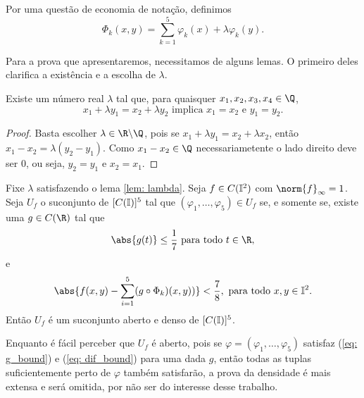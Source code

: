 \begin{rem}
    Por uma questão de economia de notação, definimos \[
        \Phi_{ k }(x, y) = \sum_{ k=1 }^{ 5 } \varphi_{ k } (x) + \lambda \varphi_{ k } (y)
    .\]
\end{rem}
Para a prova que apresentaremos, necessitamos de alguns lemas.
O primeiro deles clarifica a existência e a escolha de \( \lambda \).
\begin{lem}
    Existe um número real \( \lambda \) tal que, para quaisquer \( x_{ 1 }, x_{ 2 }, x_{ 3 }, x_{ 4 } \in \Q \), \[
        x_{ 1 } + \lambda y_{ 1 } = x_{ 2 } + \lambda y_{ 2 }
        \text{ implica }
        x_{ 1 } = x_{ 2 } \text{ e } y_{ 1 } = y_{ 2 }
    .\]
    \label{lem: lambda}
\end{lem}
\begin{proof}
    Basta escolher \( \lambda \in \R \backslash \Q \), pois se \( x_{ 1 } + \lambda y_{ 1 } = x_{ 2 } + \lambda x_{ 2 } \), então \( x_{ 1 } - x_{ 2 } = \lambda ( y_{ 2 } - y_{ 1 } ) \).
    Como \( x_{ 1 } - x_{ 2 } \in \Q \) necessariametente o lado direito deve ser \( 0 \), ou seja, \( y_{ 2 } = y_{ 1 } \) e \( x_{ 2 } = x_{ 1 } \).
\end{proof}
\begin{lem}
    Fixe \( \lambda \) satisfazendo o lema \ref{lem: lambda}.
    Seja \( f \in C(\mathbb{I}^2) \) com \( \norm{ f }_{ \infty } = 1 \).
    Seja \( U_{ f } \) o suconjunto de \( [C(\mathbb{I})]^{ 5 } \) tal que \( ( \varphi_{ 1 }, \dots, \varphi_{ 5 } ) \in U_{ f } \) se, e somente se, existe uma \( g \in C(\R) \) tal que
    \begin{equation}
        \abs{ g(t) } \leq \frac{ 1 }{ 7 } \text{ para todo } t \in \R
        \label{eq: g_bound}
    ,\end{equation}
    e
    \begin{equation}
        \abs{ 
            f(x, y)
            - \sum_{ i=1 }^{ 5 } (g \circ \Phi_{ k })(x, y) )
         }
         < \frac{ 7 }{ 8 }, \text{ para todo } x, y \in \I^2
         \label{eq: dif_bound}
    .\end{equation}
    Então \( U_{ f } \) é um suconjunto aberto e denso de \( [C(\mathbb{I})]^{ 5 } \).
    \label{lem: uf}
\end{lem}
Enquanto é fácil perceber que \( U_{ f } \) é aberto, pois se \( \varphi = ( \varphi_{ 1 }, \dots, \varphi_{ 5 } ) \) satisfaz (\ref{eq: g_bound}) e (\ref{eq: dif_bound}) para uma dada \( g \), então todas as tuplas suficientemente perto de \( \varphi \) também satisfarão, a prova da densidade é mais extensa e será omitida, por não ser do interesse desse trabalho.
